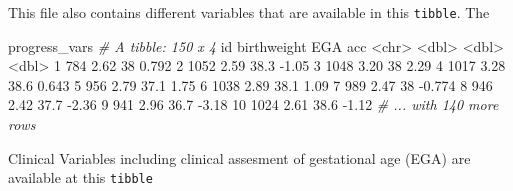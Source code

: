 \documentclass[]{article}
\newcommand{\hlnum}[1]{\textcolor[rgb]{0.816,0.125,0.439}{#1}}%
\newcommand{\hlstr}[1]{\textcolor[rgb]{0.251,0.627,0.251}{#1}}%
\newcommand{\hlcom}[1]{\textcolor[rgb]{0.502,0.502,0.502}{\textit{#1}}}%
\newcommand{\hlopt}[1]{\textcolor[rgb]{0,0,0}{#1}}%
\newcommand{\hlstd}[1]{\textcolor[rgb]{0.251,0.251,0.251}{#1}}%
\newenvironment{Shaded}{\begin{myshaded}}{\end{myshaded}}
\newcommand{\DecValTok}[1]{\hlnum{#1}}
\newcommand{\FloatTok}[1]{\hlnum{#1}}
\newcommand{\StringTok}[1]{\hlstr{#1}}
\newcommand{\CommentTok}[1]{\hlcom{#1}}
\newcommand{\OperatorTok}[1]{\hlopt{#1}}
\newcommand{\ErrorTok}[1]{\textcolor{errorcolor}{#1}}
\newcommand{\NormalTok}[1]{\hlstd{#1}}
\begin{document}
This file also contains different variables that are available in this \texttt{tibble}. The

\begin{Shaded}
\begin{Highlighting}[]
\NormalTok{progress_vars}
  \CommentTok{# A tibble: 150 x 4}
\NormalTok{     id    birthweight   EGA    acc}
     \OperatorTok{<}\NormalTok{chr}\OperatorTok{>}\StringTok{       }\ErrorTok{<}\NormalTok{dbl}\OperatorTok{>}\StringTok{ }\ErrorTok{<}\NormalTok{dbl}\OperatorTok{>}\StringTok{  }\ErrorTok{<}\NormalTok{dbl}\OperatorTok{>}
\StringTok{   }\DecValTok{1} \DecValTok{784}          \FloatTok{2.62}  \DecValTok{38}    \FloatTok{0.792}
   \DecValTok{2} \DecValTok{1052}         \FloatTok{2.59}  \FloatTok{38.3} \FloatTok{-1.05} 
   \DecValTok{3} \DecValTok{1048}         \FloatTok{3.20}  \DecValTok{38}    \FloatTok{2.29} 
   \DecValTok{4} \DecValTok{1017}         \FloatTok{3.28}  \FloatTok{38.6}  \FloatTok{0.643}
   \DecValTok{5} \DecValTok{956}          \FloatTok{2.79}  \FloatTok{37.1}  \FloatTok{1.75} 
   \DecValTok{6} \DecValTok{1038}         \FloatTok{2.89}  \FloatTok{38.1}  \FloatTok{1.09} 
   \DecValTok{7} \DecValTok{989}          \FloatTok{2.47}  \DecValTok{38}   \FloatTok{-0.774}
   \DecValTok{8} \DecValTok{946}          \FloatTok{2.42}  \FloatTok{37.7} \FloatTok{-2.36} 
   \DecValTok{9} \DecValTok{941}          \FloatTok{2.96}  \FloatTok{36.7} \FloatTok{-3.18} 
  \DecValTok{10} \DecValTok{1024}         \FloatTok{2.61}  \FloatTok{38.6} \FloatTok{-1.12} 
  \CommentTok{# ... with 140 more rows}
\end{Highlighting}
\end{Shaded}

Clinical Variables including clinical assesment of gestational age (EGA) are available at this \texttt{tibble}
\end{document}
